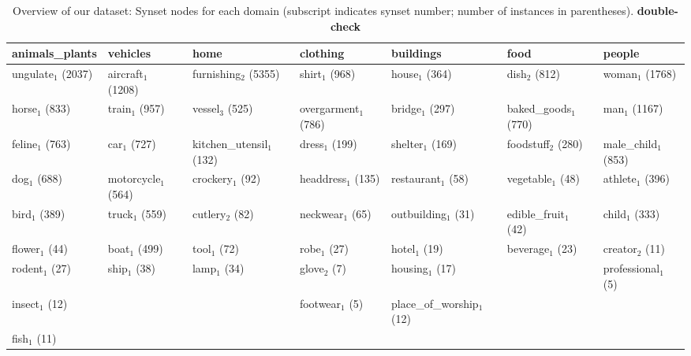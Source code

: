 \begin{table*}
\small
	\begin{tabular}{@{~}l@{~}l@{~}l@{~}l@{~}l@{~}l@{~}l}
	\toprule
	        animals\_plants &               vehicles &                        home &                clothing &                   buildings &                    food &                 people \\
	\midrule
	  ungulate$_1$ (2037) &  aircraft$_1$ (1208) &  furnishing$_2$ (5355) &  shirt$_1$ (968) &  house$_1$ (364) &  dish$_2$ (812) &  woman$_1$ (1768) \\
	 horse$_1$ (833) &  train$_1$ (957) &  vessel$_3$ (525) &  overgarment$_1$ (786) &  bridge$_1$ (297) &  baked\_goods$_1$ (770) &  man$_1$ (1167) \\
	  feline$_1$ (763) &  car$_1$ (727) &  kitchen\_utensil$_1$ (132) &  dress$_1$ (199) &  shelter$_1$ (169) &  foodstuff$_2$ (280) &  male\_child$_1$ (853) \\
	 dog$_1$ (688) &  motorcycle$_1$ (564) &  crockery$_1$ (92) &  headdress$_1$ (135) &  restaurant$_1$ (58) &  vegetable$_1$ (48) &  athlete$_1$ (396) \\
	  bird$_1$ (389) &  truck$_1$ (559) &  cutlery$_2$ (82) &  neckwear$_1$ (65) &  outbuilding$_1$ (31) &  edible\_fruit$_1$ (42) &  child$_1$ (333) \\
	  flower$_1$ (44) &  boat$_1$ (499) &  tool$_1$ (72) &  robe$_1$ (27) &  hotel$_1$ (19) &  beverage$_1$ (23) &  creator$_2$ (11) \\
	  rodent$_1$ (27) &  ship$_1$ (38) &  lamp$_1$ (34) &  glove$_2$ (7) &  housing$_1$ (17) &   &  professional$_1$ (5) \\
	 insect$_1$ (12) &   &   &  footwear$_1$ (5) &  place\_of\_worship$_1$ (12) &   &   \\
	  fish$_1$ (11) &   &   &   &   &   &   \\
	\bottomrule
\end{tabular}
	\caption{Overview of our dataset: Synset nodes for each domain (subscript indicates synset number; number of instances in parentheses). \textbf{double-check} \label{tab:overview_dataset2}}
\end{table*}


